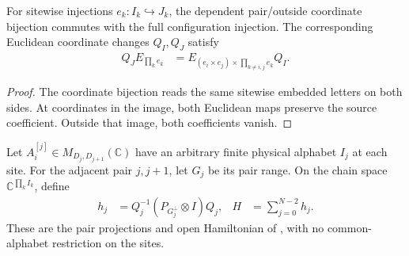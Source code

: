 \begin{lemma}
    \label{lem:dependent_physical_pair_embedding}
    \leanok
    For sitewise injections $e_k:I_k\hookrightarrow J_k$, the dependent
    pair/outside coordinate bijection commutes with the full configuration
    injection. The corresponding Euclidean coordinate changes $Q_I,Q_J$
    satisfy
    \begin{align}
        Q_J E_{\prod_k e_k}
         & =E_{(e_i\times e_j)\times\prod_{k\ne i,j}e_k} Q_I.
    \end{align}
\end{lemma}
\begin{proof}\leanok
    The coordinate bijection reads the same sitewise embedded letters on
    both sides. At coordinates in the image, both Euclidean maps preserve
    the source coefficient. Outside that image, both coefficients vanish.
\end{proof}

\begin{definition}
    \label{def:varying_physical_parent_hamiltonian}
    \leanok
    Let $A^{[j]}_i\in M_{D_j,D_{j+1}}(\mathbb C)$ have an arbitrary finite
    physical alphabet $I_j$ at each site. For the adjacent pair $j,j+1$,
    let $G_j$ be its pair range. On the
    chain space $\mathbb C^{\prod_k I_k}$, define
    \begin{align}
        h_j & =Q_j^{-1}(P_{G_j^\perp}\otimes I)Q_j,
            & H                                     & =\sum_{j=0}^{N-2}h_j.
    \end{align}
    These are the pair projections and open Hamiltonian of
    \cite[Theorem~9, lines~1195--1217]{PerezGarcia2007Matrix}, with no
    common-alphabet restriction on the sites.
\end{definition}

